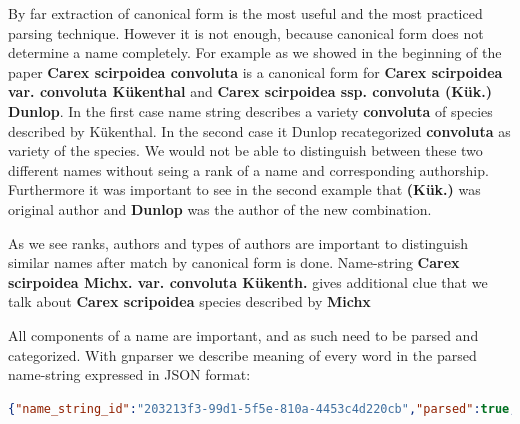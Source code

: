 \documentclass{bmcart}
\begin{document}
By far extraction of canonical form is the most useful and the most practiced
parsing technique. However it is not enough, because canonical form does not
determine a name completely. For example as we showed in the beginning of the
paper \textbf{Carex scirpoidea convoluta} is a canonical form for
\textbf{Carex scirpoidea var. convoluta Kükenthal} and \textbf{Carex
scirpoidea ssp. convoluta (Kük.) Dunlop}. In the first case name string
describes a variety \textbf{convoluta} of  species
described by Kükenthal. In the second case it Dunlop recategorized \textbf
{convoluta} as variety of the species. We would not be able to distinguish
between these two different names without seing a rank of a name and
corresponding authorship. Furthermore it was important to see in the second
example that \textbf{(Kük.)} was original author and \textbf{Dunlop} was the author of the new combination.

As we see ranks, authors and types of authors are important to distinguish
similar names after match by canonical form is done. Name-string \textbf{Carex
scirpoidea Michx. var. convoluta Kükenth.} gives additional clue that we talk
about \textbf{Carex scripoidea} species described by \textbf{Michx}

All components of a name are important, and as such need to be parsed and
categorized. With gnparser we describe meaning of every word in the parsed
name-string expressed in JSON format:

\begin{lstlisting}[language=json]
  {"name_string_id":"203213f3-99d1-5f5e-810a-4453c4d220cb","parsed":true,"quality":1,"parser_version":"0.2.0","verbatim":"Carex scirpoidea Michx. subsp. convoluta (Kük.) D.A. Dunlop","normalized":"Carex scirpoidea Michx. ssp. convoluta (Kük.) D. A. Dunlop","canonical_name":{"value":"Carex scirpoidea convoluta","extended":"Carex scirpoidea ssp. convoluta"},"hybrid":false,"surrogate":false,"virus":false,"details":[{"genus":{"value":"Carex"},"specific_epithet":{"value":"scirpoidea","authorship":{"value":"Michx.","basionym_authorship":{"authors":["Michx."]}}},"infraspecific_epithets":[{"value":"convoluta","rank":"ssp.","authorship":{"value":"(Kük.) D. A. Dunlop","basionym_authorship":{"authors":["Kük."]},"combination_authorship":{"authors":["D. A. Dunlop"]}}}]}],"positions":[["genus",0,5],["specific_epithet",6,16],["author_word",17,23],["rank",24,30],["infraspecific_epithet",31,40],["author_word",42,46],["author_word",48,50],["author_word",50,52],["author_word",53,59]]}
\end{lstlisting}
\end{document}
